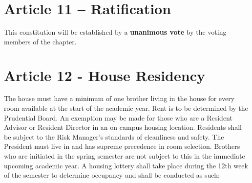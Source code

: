 \documentclass{article}
\begin{document}
\section*{Article 11 – Ratification}
\hspace*{1cm}This constitution will be established by a \textbf{unanimous vote} by the voting members of the chapter.

\section*{Article 12 - House Residency}
\hspace*{1cm}The house must have a minimum of one brother living in the house for every room available at the start of the academic year. Rent is to be determined by the Prudential Board. An exemption may be made for those who are a Resident Advisor or Resident Director in an on campus housing location. Residents shall be subject to the Risk Manager’s standards of cleanliness and safety. The President must live in and has supreme precedence in room selection. Brothers who are initiated in the spring semester are not subject to this in the immediate upcoming academic year. A housing lottery shall take place during the 12th week of the semester to determine occupancy and shall be conducted as such:
\end{document}
